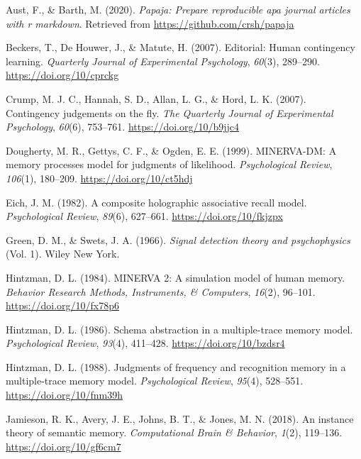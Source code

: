 \documentclass[
  english,
  man,floatsintext]{apa6}
\begin{document}
\leavevmode\hypertarget{ref-R-papaja}{}%
Aust, F., \& Barth, M. (2020). \emph{Papaja: Prepare reproducible apa journal articles with r markdown}. Retrieved from \url{https://github.com/crsh/papaja}

\leavevmode\hypertarget{ref-beckersEditorialHumanContingency2007}{}%
Beckers, T., De Houwer, J., \& Matute, H. (2007). Editorial: Human contingency learning. \emph{Quarterly Journal of Experimental Psychology}, \emph{60}(3), 289--290. \url{https://doi.org/10/cprckg}

\leavevmode\hypertarget{ref-crumpContingencyJudgementsFly2007}{}%
Crump, M. J. C., Hannah, S. D., Allan, L. G., \& Hord, L. K. (2007). Contingency judgements on the fly. \emph{The Quarterly Journal of Experimental Psychology}, \emph{60}(6), 753--761. \url{https://doi.org/10/b9jjc4}

\leavevmode\hypertarget{ref-doughertyMINERVADMMemoryProcesses1999}{}%
Dougherty, M. R., Gettys, C. F., \& Ogden, E. E. (1999). MINERVA-DM: A memory processes model for judgments of likelihood. \emph{Psychological Review}, \emph{106}(1), 180--209. \url{https://doi.org/10/ct5hdj}

\leavevmode\hypertarget{ref-eichCompositeHolographicAssociative1982}{}%
Eich, J. M. (1982). A composite holographic associative recall model. \emph{Psychological Review}, \emph{89}(6), 627--661. \url{https://doi.org/10/fkjzpx}

\leavevmode\hypertarget{ref-greenSignalDetectionTheory1966}{}%
Green, D. M., \& Swets, J. A. (1966). \emph{Signal detection theory and psychophysics} (Vol. 1). Wiley New York.

\leavevmode\hypertarget{ref-hintzmanMINERVASimulationModel1984}{}%
Hintzman, D. L. (1984). MINERVA 2: A simulation model of human memory. \emph{Behavior Research Methods, Instruments, \& Computers}, \emph{16}(2), 96--101. \url{https://doi.org/10/fx78p6}

\leavevmode\hypertarget{ref-hintzmanSchemaAbstractionMultipletrace1986}{}%
Hintzman, D. L. (1986). Schema abstraction in a multiple-trace memory model. \emph{Psychological Review}, \emph{93}(4), 411--428. \url{https://doi.org/10/bzdsr4}

\leavevmode\hypertarget{ref-hintzmanJudgmentsFrequencyRecognition1988}{}%
Hintzman, D. L. (1988). Judgments of frequency and recognition memory in a multiple-trace memory model. \emph{Psychological Review}, \emph{95}(4), 528--551. \url{https://doi.org/10/fnm39h}

\leavevmode\hypertarget{ref-jamiesonInstanceTheorySemantic2018}{}%
Jamieson, R. K., Avery, J. E., Johns, B. T., \& Jones, M. N. (2018). An instance theory of semantic memory. \emph{Computational Brain \& Behavior}, \emph{1}(2), 119--136. \url{https://doi.org/10/gf6cm7}
\end{document}
